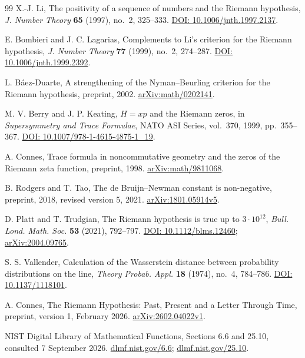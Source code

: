 \documentclass[11pt]{amsart}
\numberwithin{equation}{section}
\theoremstyle{plain}
\theoremstyle{definition}
\theoremstyle{remark}
\begin{document}
\begin{thebibliography}{99}
X.-J. Li,
The positivity of a sequence of numbers and the Riemann hypothesis,
\emph{J. Number Theory} \textbf{65} (1997), no.~2, 325--333.
\href{https://doi.org/10.1006/jnth.1997.2137}{DOI: 10.1006/jnth.1997.2137}.

E. Bombieri and J. C. Lagarias,
Complements to Li's criterion for the Riemann hypothesis,
\emph{J. Number Theory} \textbf{77} (1999), no.~2, 274--287.
\href{https://doi.org/10.1006/jnth.1999.2392}{DOI: 10.1006/jnth.1999.2392}.

L. B\'aez-Duarte,
A strengthening of the Nyman--Beurling criterion for the Riemann hypothesis,
preprint, 2002.
\href{https://arxiv.org/abs/math/0202141}{arXiv:math/0202141}.

M. V. Berry and J. P. Keating,
$H=xp$ and the Riemann zeros,
in \emph{Supersymmetry and Trace Formulae}, NATO ASI Series, vol.~370,
1999, pp.~355--367.
\href{https://doi.org/10.1007/978-1-4615-4875-1_19}{DOI: 10.1007/978-1-4615-4875-1\_19}.

A. Connes,
Trace formula in noncommutative geometry and the zeros of the Riemann zeta
function, preprint, 1998.
\href{https://arxiv.org/abs/math/9811068}{arXiv:math/9811068}.

B. Rodgers and T. Tao,
The de Bruijn--Newman constant is non-negative,
preprint, 2018, revised version 5, 2021.
\href{https://arxiv.org/abs/1801.05914v5}{arXiv:1801.05914v5}.

D. Platt and T. Trudgian,
The Riemann hypothesis is true up to $3\cdot10^{12}$,
\emph{Bull. Lond. Math. Soc.} \textbf{53} (2021), 792--797.
\href{https://doi.org/10.1112/blms.12460}{DOI: 10.1112/blms.12460};
\href{https://arxiv.org/abs/2004.09765}{arXiv:2004.09765}.

S. S. Vallender,
Calculation of the Wasserstein distance between probability distributions on
the line, \emph{Theory Probab. Appl.} \textbf{18} (1974), no.~4, 784--786.
\href{https://doi.org/10.1137/1118101}{DOI: 10.1137/1118101}.

A. Connes,
The Riemann Hypothesis: Past, Present and a Letter Through Time,
preprint, version 1, February 2026.
\href{https://arxiv.org/abs/2602.04022v1}{arXiv:2602.04022v1}.

NIST Digital Library of Mathematical Functions,
Sections 6.6 and 25.10, consulted 7 September 2026.
\href{https://dlmf.nist.gov/6.6}{dlmf.nist.gov/6.6};
\href{https://dlmf.nist.gov/25.10}{dlmf.nist.gov/25.10}.

\end{thebibliography}
\end{document}
